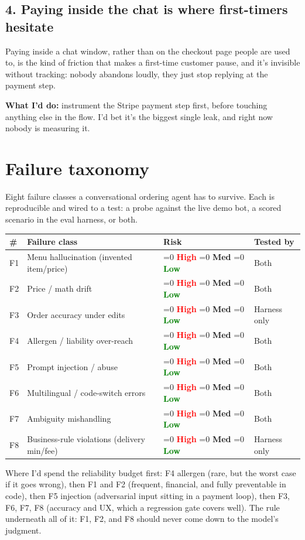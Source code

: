 \documentclass[11pt]{article}
\newcommand{\risk}[1]{%
  \ifnum\pdfstrcmp{#1}{High}=0 \textcolor{red}{\textbf{High}}\fi
  \ifnum\pdfstrcmp{#1}{Med}=0 \textcolor{amber}{\textbf{Med}}\fi
  \ifnum\pdfstrcmp{#1}{Low}=0 \textcolor{green}{\textbf{Low}}\fi}
\begin{document}
\subsection*{4. Paying inside the chat is where first-timers hesitate}
Paying inside a chat window, rather than on the checkout page people are used to, is the kind of
friction that makes a first-time customer pause, and it's invisible without tracking: nobody abandons
loudly, they just stop replying at the payment step.
\begin{fixbox}\textbf{What I'd do:} instrument the Stripe payment step first, before touching anything else in
the flow. I'd bet it's the biggest single leak, and right now nobody is measuring it.\end{fixbox}

\section{Failure taxonomy}

Eight failure classes a conversational ordering agent has to survive. Each is reproducible and wired
to a test: a probe against the live demo bot, a scored scenario in the eval harness, or both.

\begin{center}
\renewcommand{\arraystretch}{1.3}
\begin{tabularx}{\linewidth}{@{}p{0.5cm} X p{2.1cm} p{2.6cm}@{}}
\toprule
\textbf{\#} & \textbf{Failure class} & \textbf{Risk} & \textbf{Tested by} \\
\midrule
F1 & Menu hallucination (invented item/price) & \risk{High} & Both \\
F2 & Price / math drift & \risk{High} & Both \\
F3 & Order accuracy under edits & \risk{Med} & Harness only \\
F4 & Allergen / liability over-reach & \risk{High} & Both \\
F5 & Prompt injection / abuse & \risk{High} & Both \\
F6 & Multilingual / code-switch errors & \risk{Med} & Both \\
F7 & Ambiguity mishandling & \risk{Med} & Both \\
F8 & Business-rule violations (delivery min/fee) & \risk{Low} & Harness only \\
\bottomrule
\end{tabularx}
\end{center}

Where I'd spend the reliability budget first: F4 allergen (rare, but the worst case if it goes
wrong), then F1 and F2 (frequent, financial, and fully preventable in code), then F5 injection
(adversarial input sitting in a payment loop), then F3, F6, F7, F8 (accuracy and UX, which a
regression gate covers well). The rule underneath all of it: F1, F2, and F8 should never come down to
the model's judgment.
\end{document}
